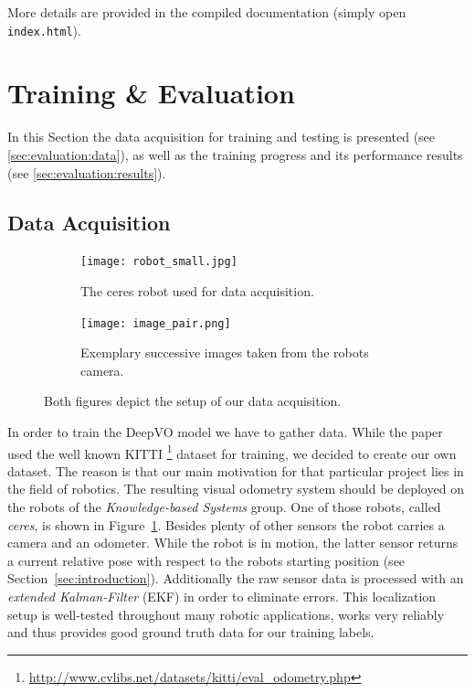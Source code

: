 \documentclass[a4paper,11pt]{article}
\begin{document}
More details are provided in the compiled documentation (simply open
\texttt{index.html}).

\section{Training \& Evaluation}
\label{sec:evaluation}
In this Section the data acquisition for training and testing is presented (see
\autoref{sec:evaluation:data}), as well as the training progress and its
performance results (see \autoref{sec:evaluation:results}).


\subsection{Data Acquisition}
\label{sec:evaluation:data}
\begin{figure}[htb]
    \centering
    \begin{subfigure}[t]{0.6\linewidth}
            \centering
            \texttt{[image: robot\_small.jpg]}
            \caption[]{The ceres robot used for data acquisition.}
            \label{fig:robot}
    \end{subfigure}
    \begin{subfigure}[t]{0.39\linewidth}
            \centering
            \texttt{[image: image\_pair.png]}
            \caption[]{Exemplary successive images taken from the robots camera.}
            \label{fig:camera_images}
    \end{subfigure}
    \caption[]{Both figures depict the setup of our data acquisition.}
    \label{fig:setup}
\end{figure}

In order to train the DeepVO model we have to gather data. While the paper used the well known KITTI \footnote{\url{http://www.cvlibs.net/datasets/kitti/eval_odometry.php}} dataset for training, we decided to create our own dataset. The reason is that our main motivation for that particular project lies in the field of robotics. The resulting visual odometry system should be deployed on the robots of the \emph{Knowledge-based Systems} group. One of those robots, called \emph{ceres}, is shown in Figure~\ref{fig:robot}. Besides plenty of other sensors the robot carries a camera and an odometer. While the robot is in motion, the latter sensor returns a current relative pose with respect to the robots starting position (see Section~\ref{sec:introduction}). Additionally the raw sensor data is processed with an \emph{extended Kalman-Filter} (EKF) in order to eliminate errors. This localization setup is well-tested throughout many robotic applications, works very reliably and thus provides good ground truth data for our training labels.
\end{document}
